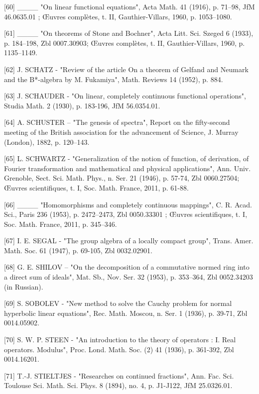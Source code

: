 {[}60{]} \_\_\_\_ "On linear functional equations", Acta Math. 41 (1916), p. 71--98, JfM 46.0635.01 ; Œuvres complètes, t. II, Gauthier-Villars, 1960, p. 1053--1080.

{[}61{]} \_\_\_\_ "On theorems of Stone and Bochner", Acta Litt. Sci. Szeged 6 (1933), p. 184--198, Zbl 0007.30903; Œuvres complètes, t. II, Gauthier-Villars, 1960, p. 1135--1149.

{[}62{]} J. SCHATZ - "Review of the article On a theorem of Gelfand and Neumark and the B*-algebra by M. Fukamiya", Math. Reviews 14 (1952), p. 884.

{[}63{]} J. SCHAUDER - "On linear, completely continuous functional operations", Studia Math. 2 (1930), p. 183-196, JfM 56.0354.01.

{[}64{]} A. SCHUSTER -- "The genesis of spectra", Report on the fifty-second meeting of the British association for the advancement of Science, J. Murray (London), 1882, p. 120--143.

{[}65{]} L. SCHWARTZ - "Generalization of the notion of function, of derivation, of Fourier transformation and mathematical and physical applications", Ann. Univ. Grenoble, Sect. Sci. Math. Phys., n. Ser. 21 (1946), p. 57-74, Zbl 0060.27504; Œuvres scientifiques, t. I, Soc. Math. France, 2011, p. 61-88.

{[}66{]} \_\_\_\_ "Homomorphisms and completely continuous mappings", C. R. Acad. Sci., Paris 236 (1953), p. 2472--2473, Zbl 0050.33301 ; Œuvres scientifiques, t. I, Soc. Math. France, 2011, p. 345--346.

{[}67{]} I. E. SEGAL - "The group algebra of a locally compact group", Trans. Amer. Math. Soc. 61 (1947), p. 69-105, Zbl 0032.02901.

{[}68{]} G. E. SHILOV -- "On the decomposition of a commutative normed ring into a direct sum of ideals", Mat. Sb., Nov. Ser. 32 (1953), p. 353--364, Zbl 0052.34203 (in Russian).

{[}69{]} S. SOBOLEV - "New method to solve the Cauchy problem for normal hyperbolic linear equations", Rec. Math. Moscou, n. Ser. 1 (1936), p. 39-71, Zbl 0014.05902.

{[}70{]} S. W. P. STEEN - "An introduction to the theory of operators : I. Real operators. Modulus", Proc. Lond. Math. Soc. (2) 41 (1936), p. 361-392, Zbl 0014.16201.

{[}71{]} T.-J. STIELTJES - "Researches on continued fractions", Ann. Fac. Sci. Toulouse Sci. Math. Sci. Phys. 8 (1894), no. 4, p. J1-J122, JfM 25.0326.01.

